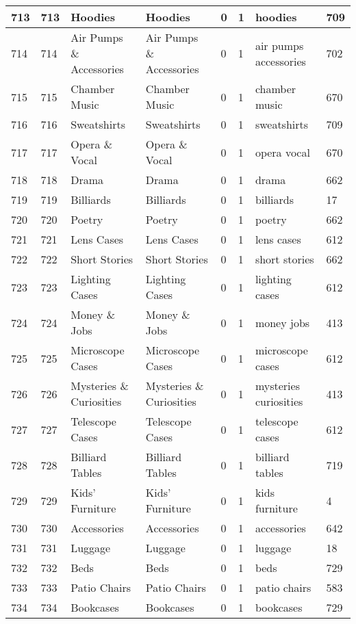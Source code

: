 \begin{longtable}{|l|l|l|l|l|l|l|l|}
713 & 713 & Hoodies & Hoodies & 0 & 1 & hoodies & 709 \\ \hline 
714 & 714 & Air Pumps \& Accessories & Air Pumps \& Accessories & 0 & 1 & air pumps accessories & 702 \\ \hline 
715 & 715 & Chamber Music & Chamber Music & 0 & 1 & chamber music & 670 \\ \hline 
716 & 716 & Sweatshirts & Sweatshirts & 0 & 1 & sweatshirts & 709 \\ \hline 
717 & 717 & Opera \& Vocal & Opera \& Vocal & 0 & 1 & opera vocal & 670 \\ \hline 
718 & 718 & Drama & Drama & 0 & 1 & drama & 662 \\ \hline 
719 & 719 & Billiards & Billiards & 0 & 1 & billiards & 17 \\ \hline 
720 & 720 & Poetry & Poetry & 0 & 1 & poetry & 662 \\ \hline 
721 & 721 & Lens Cases & Lens Cases & 0 & 1 & lens cases & 612 \\ \hline 
722 & 722 & Short Stories & Short Stories & 0 & 1 & short stories & 662 \\ \hline 
723 & 723 & Lighting Cases & Lighting Cases & 0 & 1 & lighting cases & 612 \\ \hline 
724 & 724 & Money \& Jobs & Money \& Jobs & 0 & 1 & money jobs & 413 \\ \hline 
725 & 725 & Microscope Cases & Microscope Cases & 0 & 1 & microscope cases & 612 \\ \hline 
726 & 726 & Mysteries \& Curiosities & Mysteries \& Curiosities & 0 & 1 & mysteries curiosities & 413 \\ \hline 
727 & 727 & Telescope Cases & Telescope Cases & 0 & 1 & telescope cases & 612 \\ \hline 
728 & 728 & Billiard Tables & Billiard Tables & 0 & 1 & billiard tables & 719 \\ \hline 
729 & 729 & Kids' Furniture & Kids' Furniture & 0 & 1 & kids furniture & 4 \\ \hline 
730 & 730 & Accessories & Accessories & 0 & 1 & accessories & 642 \\ \hline 
731 & 731 & Luggage & Luggage & 0 & 1 & luggage & 18 \\ \hline 
732 & 732 & Beds & Beds & 0 & 1 & beds & 729 \\ \hline 
733 & 733 & Patio Chairs & Patio Chairs & 0 & 1 & patio chairs & 583 \\ \hline 
734 & 734 & Bookcases & Bookcases & 0 & 1 & bookcases & 729 \\ \hline 

\end{longtable}
